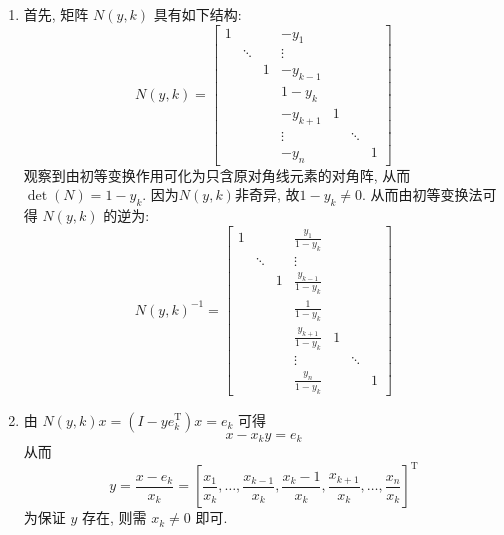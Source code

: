 \documentclass[12pt, answers]{exam}     %
\newcommand{\T}{\mathrm{T}}
\begin{document}
\begin{questions}
\begin{solution}
\begin{enumerate}[label=(\arabic*)]
    \item 首先, 矩阵 \( N(y, k) \) 具有如下结构: 
    \[
    N(y, k) = 
    \begin{bmatrix}
    1 & & & -y_1 & & \\
      & \ddots & & \vdots & & \\
      & & 1 & -y_{k-1} & & \\
      & & & 1 - y_k & & \\
      & & & -y_{k+1} & 1 & \\
      & & & \vdots & & \ddots \\
      & & & -y_n & & & 1
    \end{bmatrix}
    \]
    观察到由初等变换作用可化为只含原对角线元素的对角阵, 从而\( \det(N) = 1 - y_k \). 因为$N(y,k)$非奇异, 故\( 1 - y_k \neq 0 \).
    从而由初等变换法可得 \( N(y, k) \) 的逆为:
    \[
    N(y, k)^{-1} = \begin{bmatrix}
    1 & & & \frac{y_1}{1 - y_k} & & \\
      & \ddots & & \vdots & & \\
      & & 1 & \frac{y_{k-1}}{1 - y_k} & & \\
      & & & \frac{1}{1 - y_k} & & \\
      & & & \frac{y_{k+1}}{1 - y_k} & 1 & \\
      & & & \vdots & & \ddots \\
      & & & \frac{y_n}{1 - y_k} & & & 1
    \end{bmatrix}
    \]

    \item 由 \( N(y, k)x = (I - y e_k^{\T})x = e_k \) 可得
    \[
    x - x_k y = e_k
    \]
    从而
    \[
    y = \frac{x - e_k}{x_k} = \left[ \frac{x_1}{x_k}, \ldots, \frac{x_{k-1}}{x_k}, \frac{x_k - 1}{x_k}, \frac{x_{k+1}}{x_k}, \ldots, \frac{x_n}{x_k} \right]^{\T}
    \]
    为保证 \( y \) 存在, 则需 \( x_k \neq 0 \) 即可.


\end{enumerate}
\end{solution}
\end{questions}
\end{document}
